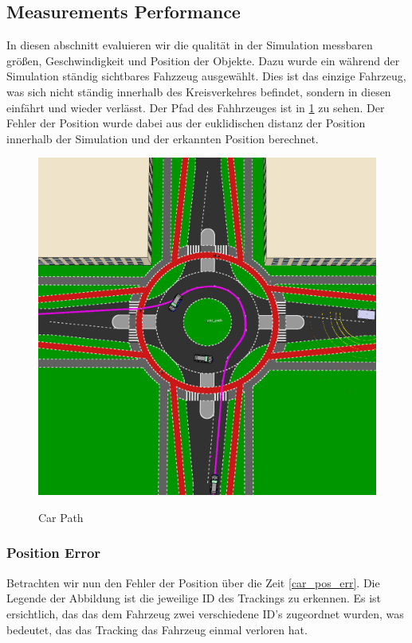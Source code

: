 \documentclass[11pt,oneside,openright]{mpreport}
\begin{document}
\subsection{Measurements Performance}

In diesen abschnitt evaluieren wir die qualität in der Simulation messbaren größen, Geschwindigkeit und Position der Objekte.
Dazu wurde ein während der Simulation ständig sichtbares Fahzzeug ausgewählt. Dies ist das einzige Fahrzeug, was sich nicht ständig innerhalb des Kreisverkehres befindet, sondern in diesen einfährt und wieder verlässt.
Der Pfad des Fahhrzeuges ist in \cref{car_path1} zu sehen. Der Fehler der Position wurde dabei aus der euklidischen distanz der Position innerhalb der Simulation und der erkannten Position berechnet.

\begin{figure}[!htb]
  \caption{Car Path} 
  \centering
  \includegraphics[width=\textwidth]{bilder/car_path.png}
 \label{car_path1}
\end{figure}

\subsubsection{Position Error}

Betrachten wir nun den Fehler der Position über die Zeit \cref{car_pos_err}. Die Legende der Abbildung ist die jeweilige ID des Trackings zu erkennen.
Es ist ersichtlich, das das dem Fahrzeug zwei verschiedene ID's zugeordnet wurden, was bedeutet, das das Tracking das Fahrzeug einmal verloren hat.
\end{document}
